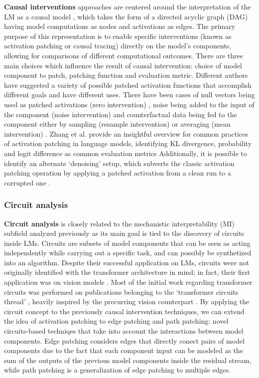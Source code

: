 \textbf{Causal interventions} approaches are centered around the interpretation of the LM as a causal model \cite{geiger2021}, which takes the form of a directed acyclic graph (DAG) having model computations as nodes and activations as edges.
The primary purpose of this representation is to enable specific interventions (known as activation patching or causal tracing) directly on the model's components, allowing for comparisons of different computational outcomes.
There are three main choices which influence the result of causal intervention: choice of model component to patch, patching function and evaluation metric.
Different authors have suggested a variety of possible patched activation functions that accomplish different goals and have different uses.
There have been cases of null vectors being used as patched activations (zero intervention) \cite{olsson2022, mohebbi2023}, noise being added to the input of the component (noise intervention) \cite{meng2022} and counterfactual data being fed to the component either by sampling (resample intervention) \cite{hanna2023, conmy2023} or averaging (mean intervention) \cite{wang2022}.
Zhang et al. provide an insightful overview for common practices of activation patching in language models, identifying KL divergence, probability and logit difference as common evaluation metrics \cite{zhang2024}
Additionally, it is possible to identify an alternate `denoising' setup, which subverts the classic activation patching operation by applying a patched activation from a clean run to a corrupted one \cite{lieberum2023, meng2022}.


\subsubsection{Circuit analysis}

\textbf{Circuit analysis} is closely related to the mechanistic interpretability (MI) subfield analyzed previously as its main goal is tied to the discovery of circuits inside LMs.
Circuits are subsets of model components that can be seen as acting independently while carrying out a specific task, and can possibly be synthetized into an algorithm.
Despite their successful application on LMs, circuits were not originally identified with the transformer architecture in mind; in fact, their first application was on vision models \cite{cammarata2020}.
Most of the initial work regarding transformer circuits was performed on publications belonging to the `transformer circuits thread' , heavily inspired by the precurring vision counterpart \cite{cammarata2020}.
By applying the circuit concept to the previously causal intervention techniques, we can extend the idea of activation patching to edge patching and path patching: novel circuits-based techniqes that take into account the interactions between model components.
Edge patching  considers edges that directly conect pairs of model components due to the fact that each component input can be modeled as the sum of the outputs of the previous model components inside the residual stream, while path patching  is a generalization of edge patching to multiple edges.

